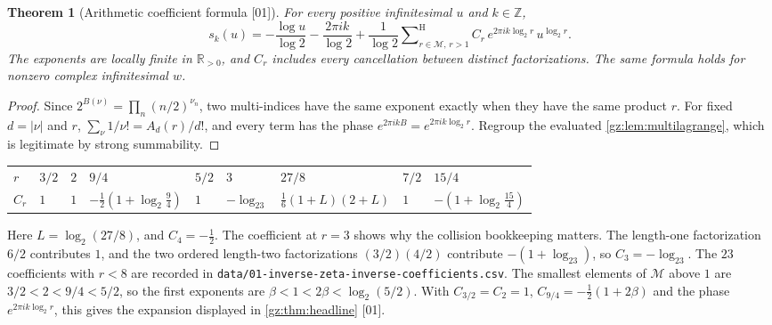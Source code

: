 \documentclass[11pt,a4paper]{article}
\numberwithin{equation}{section}
\newtheorem{theorem}{Theorem}[section]
\theoremstyle{definition}
\theoremstyle{remark}
\newcommand{\R}{\mathbb R}
\newcommand{\Z}{\mathbb Z}
\newcommand{\Sh}{\mathop{\textstyle\sum}\nolimits^{\mathrm H}}
\newcommand{\src}[1]{\textup{[#1]}}
\begin{document}
\begin{theorem}[Arithmetic coefficient formula \src{01}]\label{gz:thm:arithmetic}
For every positive infinitesimal $u$ and $k\in\Z$,
\[
s_k(u)=-\frac{\log u}{\log2}-\frac{2\pi ik}{\log2}+\frac1{\log2}\Sh_{r\in\mathcal M,\,r>1}C_r\,e^{2\pi ik\log_2r}\,u^{\log_2r}.
\]
The exponents are locally finite in $\R_{>0}$, and $C_r$ includes every
cancellation between distinct factorizations. The same formula holds for
nonzero complex infinitesimal $w$.
\end{theorem}
\begin{proof}
Since $2^{B(\nu)}=\prod_n(n/2)^{\nu_n}$, two multi-indices have the same
exponent exactly when they have the same product $r$. For fixed $d=|\nu|$
and $r$, $\sum_{\nu}1/\nu!=A_d(r)/d!$, and every term has the phase
$e^{2\pi ikB}=e^{2\pi ik\log_2r}$. Regroup the evaluated
\cref{gz:lem:multilagrange}, which is legitimate by strong summability.
\end{proof}
\begin{center}\small
\begin{tabular}{@{}lllllllll@{}}
\toprule
$r$ & $3/2$ & $2$ & $9/4$ & $5/2$ & $3$ & $27/8$ & $7/2$ & $15/4$\\
$C_r$ & $1$ & $1$ & $-\tfrac12(1+\log_2\tfrac94)$ & $1$ & $-\log_23$ & $\tfrac16(1+L)(2+L)$ & $1$ & $-(1+\log_2\tfrac{15}4)$\\
\bottomrule
\end{tabular}
\end{center}
Here $L=\log_2(27/8)$, and $C_4=-\tfrac12$. The coefficient at $r=3$ shows
why the collision bookkeeping matters. The length-one factorization
$6/2$ contributes $1$, and the two ordered length-two factorizations
$(3/2)(4/2)$ contribute $-(1+\log_23)$, so $C_3=-\log_23$. The $23$
coefficients with $r<8$ are recorded in
\texttt{data/01-inverse-zeta-inverse-coefficients.csv}.
The smallest elements of $\mathcal M$ above $1$ are $3/2<2<9/4<5/2$, so the
first exponents are $\beta<1<2\beta<\log_2(5/2)$. With $C_{3/2}=C_2=1$,
$C_{9/4}=-\tfrac12(1+2\beta)$ and the phase $e^{2\pi ik\log_2r}$, this gives
the expansion displayed in \cref{gz:thm:headline} \src{01}.
\end{document}

